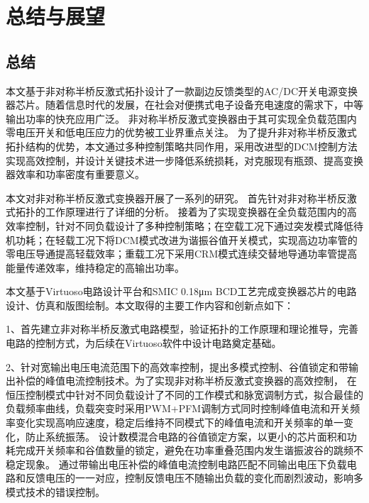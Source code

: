 \chapter{总结与展望}


\section{总结}

本文基于非对称半桥反激式拓扑设计了一款副边反馈类型的AC/DC开关电源变换器芯片。随着信息时代的发展，在社会对便携式电子设备充电速度的需求下，中等输出功率的快充应用广泛。
非对称半桥反激式变换器由于其可实现全负载范围内零电压开关和低电压应力的优势被工业界重点关注。
为了提升非对称半桥反激式拓扑结构的优势，本文通过多种控制策略共同作用，采用改进型的DCM控制方法实现高效控制，并设计关键技术进一步降低系统损耗，对克服现有瓶颈、提高变换器效率和功率密度有重要意义。

本文对非对称半桥反激式变换器开展了一系列的研究。
首先针对非对称半桥反激式拓扑的工作原理进行了详细的分析。
接着为了实现变换器在全负载范围内的高效率控制，针对不同负载设计了多种控制策略；在空载工况下通过突发模式降低待机功耗；在轻载工况下将DCM模式改进为谐振谷值开关模式，实现高边功率管的零电压导通提高轻载效率；重载工况下采用CRM模式连续交替地导通功率管提高能量传递效率，维持稳定的高输出功率。



本文基于Virtuoso电路设计平台和SMIC 0.18μm BCD工艺完成变换器芯片的电路设计、仿真和版图绘制。本文取得的主要工作内容和创新点如下：

1、首先建立非对称半桥反激式电路模型，验证拓扑的工作原理和理论推导，完善电路的控制方式，为后续在Virtuoso软件中设计电路奠定基础。

2、针对宽输出电压电流范围下的高效率控制，提出多模式控制、谷值锁定和带输出补偿的峰值电流控制技术。为了实现非对称半桥反激式变换器的高效控制，
在恒压控制模式中针对不同负载设计了不同的工作模式和脉宽调制方式，拟合最佳的负载频率曲线，负载突变时采用PWM+PFM调制方式同时控制峰值电流和开关频率变化实现高响应速度，稳定后维持不同模式下的峰值电流和开关频率的单一变化，防止系统振荡。
设计数模混合电路的谷值锁定方案，以更小的芯片面积和功耗完成开关频率和谷值数量的锁定，避免在功率重叠范围内发生谐振波谷的跳频不稳定现象。
通过带输出电压补偿的峰值电流控制电路匹配不同输出电压下负载电路和反馈电压的一一对应，控制反馈电压不随输出负载的变化而剧烈波动，影响多模式技术的错误控制。


